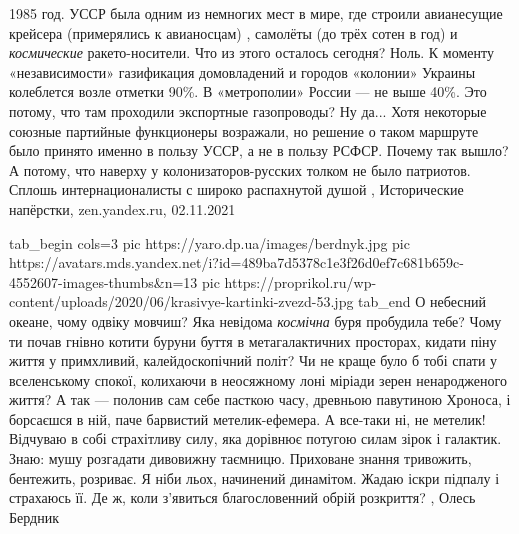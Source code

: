 1985 год. УССР была одним из немногих мест в мире, где строили авианесущие
крейсера (примерялись к авианосцам) , самолёты (до трёх сотен в год) и
\emph{космические} ракето-носители. Что из этого осталось сегодня? Ноль. К моменту
«независимости» газификация домовладений и городов «колонии» Украины колеблется
возле отметки 90\%. В «метрополии» России — не выше 40\%.  Это потому, что там
проходили экспортные газопроводы? Ну да... Хотя некоторые союзные партийные
функционеры возражали, но решение о таком маршруте было принято именно в пользу
УССР, а не в пользу РСФСР. Почему так вышло? А потому, что наверху у
колонизаторов-русских толком не было патриотов. Сплошь интернационалисты с
широко распахнутой душой
, 
Исторические напёрстки, zen.yandex.ru, 02.11.2021

\ifcmt
  tab_begin cols=3
     pic https://yaro.dp.ua/images/berdnyk.jpg
     pic https://avatars.mds.yandex.net/i?id=489ba7d5378c1e3f26d0ef7c681b659c-4552607-images-thumbs&n=13
		 pic https://proprikol.ru/wp-content/uploads/2020/06/krasivye-kartinki-zvezd-53.jpg
  tab_end
\fi
О небесний океане, чому одвіку мовчиш? Яка невідома \emph{космічна} буря пробудила
тебе? Чому ти почав гнівно котити буруни буття в метагалактичних просторах,
кидати піну життя у примхливий, калейдоскопічний політ? Чи не краще було б тобі
спати у вселенському спокої, колихаючи в неосяжному лоні міріади зерен
ненародженого життя? А так — полонив сам себе пасткою часу, древньою павутиною
Хроноса, і борсаєшся в ній, паче барвистий метелик-ефемера. А все-таки ні, не
метелик! Відчуваю в собі страхітливу силу, яка дорівнює потугою силам зірок і
галактик. Знаю: мушу розгадати дивовижну таємницю. Приховане знання тривожить,
бентежить, розриває. Я ніби льох, начинений динамітом. Жадаю іскри підпалу і
страхаюсь її. Де ж, коли з’явиться благословенний обрій розкриття?
, Олесь Бердник
